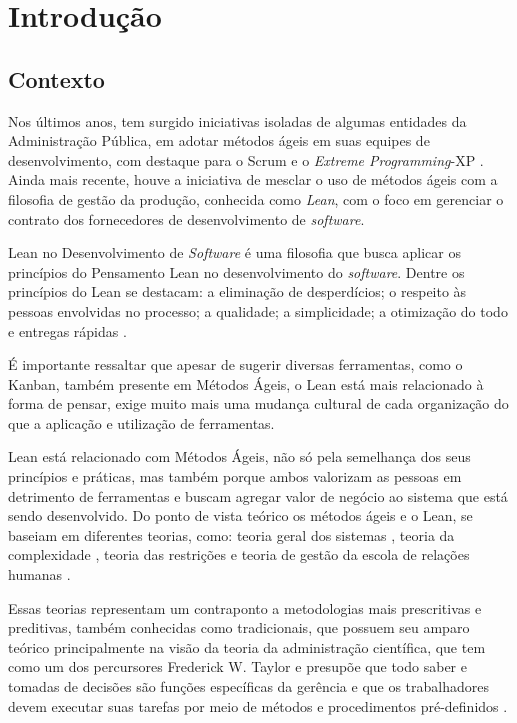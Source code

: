 
\chapter[Introdução]{Introdução}



\section[Contexto]{Contexto}

Nos últimos anos, tem surgido iniciativas isoladas de algumas entidades da Administração Pública, em adotar métodos ágeis em suas equipes de desenvolvimento, com destaque para o Scrum e o \textit{Extreme Programming}-XP \cite{TCU:2013} \cite{RTMAC}.  Ainda mais recente, houve a iniciativa de mesclar o uso de métodos ágeis com a filosofia de gestão da produção, conhecida como \textit{Lean}, com o foco em gerenciar o contrato dos fornecedores de desenvolvimento de \textit{software}. 

Lean no Desenvolvimento de \textit{Software} é uma filosofia que busca aplicar os princípios do Pensamento Lean no desenvolvimento do \textit{software}. Dentre os princípios do Lean se destacam: a eliminação de desperdícios; o respeito às pessoas envolvidas no processo; a qualidade; a simplicidade; a otimização do todo e entregas rápidas \cite{poppendieck}.

É importante ressaltar que apesar de sugerir diversas ferramentas, como o Kanban, também presente em Métodos Ágeis, o Lean está mais relacionado à forma de pensar, exige muito mais uma mudança cultural de cada organização do que a aplicação e utilização de ferramentas. 

Lean está relacionado com Métodos Ágeis, não só pela semelhança dos seus princípios e práticas, mas também porque ambos valorizam as pessoas em detrimento de ferramentas e buscam agregar valor de negócio ao sistema que está sendo desenvolvido. Do ponto de vista teórico os métodos ágeis e o Lean, se baseiam em diferentes teorias, como: teoria geral dos sistemas \cite{sistemas}, teoria da complexidade \cite{complexidade}, teoria das restrições \cite{katayama2010} e teoria de gestão da escola de relações humanas \cite{administracao}. 

Essas teorias representam um contraponto a metodologias mais prescritivas e preditivas, também conhecidas como tradicionais, que possuem seu amparo teórico principalmente na visão da teoria da administração científica, que tem como um dos percursores Frederick W. Taylor e presupõe que todo saber e tomadas de decisões são funções específicas da gerência e que os trabalhadores devem executar suas tarefas por meio de métodos e procedimentos pré-definidos \cite{administracao}.

